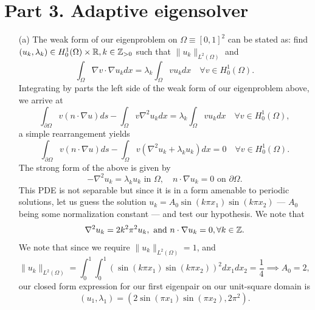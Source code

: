 \documentclass{article}
\begin{document}
\section*{Part 3. Adaptive eigensolver}
\begin{itemize}
	\item[(a)] The weak form of our eigenproblem on \(\Omega \equiv [0,1]^2 \) can be stated as: find \((u_k,\lambda_k) \in H^1_0(\Omega)\times \mathbb{R}, k\in \mathbb{Z}_{>0} \) such that \(\|u_k\|_{L^2(\Omega)} \) and 
	\begin{equation*}
		\int_\Omega \nabla v \cdot \nabla u_k dx = \lambda_k \int_\Omega vu_kdx \quad \forall v \in H^1_0(\Omega).
	\end{equation*}
	Integrating by parts the left side of the  weak form of our eigenproblem above, we arrive at
	\begin{equation*}
		\int_{\partial\Omega} v(n\cdot\nabla u) ds - \int_\Omega v \nabla^2 u_k dx = \lambda_k \int_\Omega vu_kdx \quad \forall v \in H^1_0(\Omega),
	\end{equation*}
	a simple rearrangement yields
	\begin{equation*}
		\int_{\partial\Omega} v(n\cdot\nabla u) ds - \int_\Omega v(\nabla^2 u_k + \lambda_ku_k) dx = 0 \quad \forall v \in H^1_0(\Omega).
	\end{equation*}
	The strong form of the above is given by
	\begin{equation*}
		-\nabla^2u_k = \lambda_ku_k \text{ in } \Omega, \quad n\cdot\nabla u_k = 0 \text{ on } \partial\Omega.
	\end{equation*}
	This PDE is not separable but since it is in a form amenable to periodic solutions, let us guess the solution \(u_k = A_0\sin(k\pi x_1)\sin(k\pi x_2) \) --- \(A_0\) being some normalization constant --- and test our hypothesis. We note that 
	\begin{equation*}
		\nabla^2 u_k = 2k^2\pi^2u_k, \text{ and } n\cdot\nabla u_k = 0, \forall k\in\mathbb{Z}.
	\end{equation*}
	We note that since we require \(\|u_k\|_{L^2(\Omega)} = 1 \), and 
	\begin{equation*}
		\|u_k\|_{L^2(\Omega)} = \int_0^1\int_0^1 (\sin(k\pi x_1)\sin(k\pi x_2))^2 dx_1dx_2 = \dfrac{1}{4} \implies A_0 = 2,
	\end{equation*}
	our closed form expression for our first eigenpair on our unit-square domain is 
	\begin{equation*}
		(u_1, \lambda_1) = (2\sin(\pi x_1)\sin(\pi x_2), 2\pi^2).
	\end{equation*}
	

\end{itemize}
\end{document}
